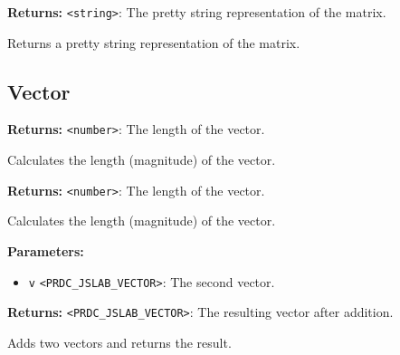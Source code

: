 \documentclass[12pt,a4paper]{article}
\begin{document}
\vspace{5mm}
\noindent {}


\noindent \textbf{Returns:} \texttt{<string>}: The pretty string representation of the matrix.

\noindent Returns a pretty string representation of the matrix.


\subsection{Vector}
\vspace{5mm}
\noindent {}


\noindent \textbf{Returns:} \texttt{<number>}: The length of the vector.

\noindent Calculates the length (magnitude) of the vector.

\vspace{5mm}
\noindent {}


\noindent \textbf{Returns:} \texttt{<number>}: The length of the vector.

\noindent Calculates the length (magnitude) of the vector.

\vspace{5mm}
\noindent {}


\noindent \textbf{Parameters:}
\begin{itemize}
  \item \texttt{v} \texttt{<PRDC\_JSLAB\_VECTOR>}: The second vector.
\end{itemize}

\noindent \textbf{Returns:} \texttt{<PRDC\_JSLAB\_VECTOR>}: The resulting vector after addition.

\noindent Adds two vectors and returns the result.

\vspace{5mm}
\noindent {}
\end{document}
